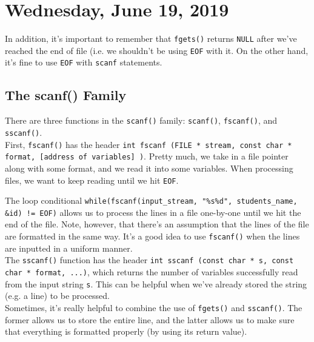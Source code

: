 \section{Wednesday, June 19, 2019}


In addition, it's important to remember that \verb!fgets()! returns \verb!NULL! after we've reached the end of file (i.e. we shouldn't be using \verb!EOF! with it. On the other hand, it's fine to use \verb!EOF! with \verb!scanf! statements. 


\subsection{The scanf() Family}

There are three functions in the \verb!scanf()! family: \verb!scanf()!, \verb!fscanf()!, and \verb!sscanf()!. \\

First, \verb!fscanf()! has the header \verb!int fscanf (FILE * stream, const char * format, [address of variables] )!. Pretty much, we take in a file pointer along with some format, and we read it into some variables. When processing files, we want to keep reading until we hit \verb!EOF!. 

The loop conditional \verb|while(fscanf(input_stream, "%s%d", students_name, &id) != EOF)| allows us to process the lines in a file one-by-one until we hit the end of the file. Note, however, that there's an assumption that the lines of the file are formatted in the same way. It's a good idea to use \verb!fscanf()! when the lines are inputted in a uniform manner. \\

The \verb!sscanf()! function has the header \texttt{int sscanf (const char * s, const char * format, ...)}, which returns the number of variables successfully read from the input string \verb!s!. This can be helpful when we've already stored the string (e.g. a line) to be processed. \\



Sometimes, it's really helpful to combine the use of \verb!fgets()! and \verb!sscanf()!. The former allows us to store the entire line, and the latter allows us to make sure that everything is formatted properly (by using its return value). 


